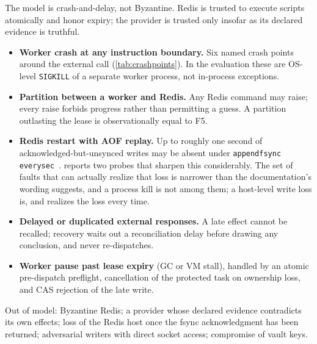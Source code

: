 The model is crash-and-delay, not Byzantine. Redis is trusted to execute
scripts atomically
and honor expiry; the provider is trusted only insofar as its declared
evidence is truthful.

\begin{itemize}
\item[\textbf{F1}] \textbf{Worker crash at any instruction boundary.} Six named
      crash points around the external call
      (\cref{tab:crashpoints}). In the evaluation these are OS-level
      \texttt{SIGKILL} of a separate worker process, not in-process
      exceptions.
\item[\textbf{F2}] \textbf{Partition between a worker and Redis.} Any Redis
      command may raise; every raise forbids progress rather than permitting a
      guess. A partition outlasting the lease is observationally equal to F5.
\item[\textbf{F3}] \textbf{Redis restart with AOF replay.} Up to roughly one
      second of acknowledged-but-unsynced writes may be absent under
      \texttt{appendfsync everysec}~\cite{redis-persistence}.
       reports two probes that sharpen this
      considerably. The set of faults that can actually realize that loss is
      narrower than the documentation's wording suggests, and a process kill
      is not among them; a host-level write loss is, and realizes the loss
      every time.
\item[\textbf{F4}] \textbf{Delayed or duplicated external responses.} A late
      effect cannot be recalled; recovery waits out a reconciliation delay
      before drawing any conclusion, and never re-dispatches.
\item[\textbf{F5}] \textbf{Worker pause past lease expiry} (GC or VM stall),
      handled by an atomic pre-dispatch preflight, cancellation of the
      protected task on ownership loss, and CAS rejection of the late write.
\end{itemize}

Out of model: Byzantine Redis; a provider whose declared evidence contradicts
its own effects; loss of the Redis host once the fsync acknowledgment has been
returned; adversarial writers with direct socket access; compromise of vault
keys.

